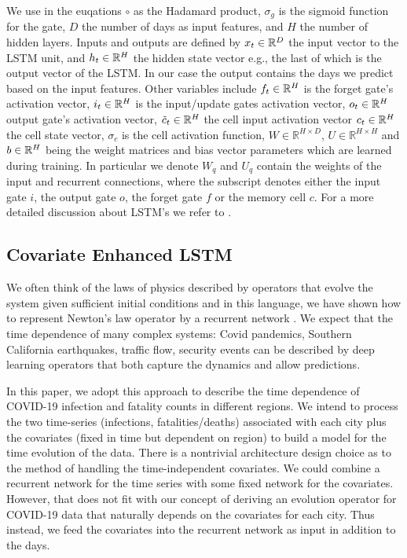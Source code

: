 \documentclass[a4paper, inpress]{jds} %
\renewcommand{\_}{%
    \textunderscore\hspace{0pt}%
}
\begin{document}
We use in the euqations $\circ$ as the Hadamard product,
$\sigma_g$ is the sigmoid function for the gate,
$D$ the number of days as input features, and
$H$ the number of hidden layers.
Inputs and outputs are defined by 
$x_{t} \in \mathbb{R}^{D}$ the input vector to the LSTM unit, and 
$h_{t}\in \mathbb{R}^{H}$ the hidden state vector e.g., the last of which is the output vector of the LSTM. In our case the output contains the days we predict based on the input features. Other variables include
$f_t \in \mathbb{R}^{H}$ is the forget gate's activation vector, 
$i_t \in \mathbb{R}^{H}$ is the input/update gates activation vector, 
$o_{t}\in \mathbb{R}^{H}$ output gate's activation vector, 
$\tilde{c}_{t}\in \mathbb{R}^{H}$ the cell input activation vector
$c_{t}\in \mathbb{R}^{H}$ the cell state vector,  
$\sigma_c$ is the cell activation function, 
$W\in \mathbb {R} ^{H\times D}$, $U\in \mathbb {R} ^{H\times H}$ and $b\in \mathbb{R}^{H}$ being the weight matrices and bias vector parameters which are learned during training.
In particular we denote $W_{q}$ and $U_{q}$ contain the weights of the
input and recurrent connections, where the subscript denotes either
the input gate $i$, the output gate $o$, the forget gate $f$ or the
memory cell $c$. For a more detailed discussion about LSTM's we refer to \cite{lstm-explained}. 



\subsection{Covariate Enhanced LSTM}

We often think of the laws of physics described by operators that
evolve the system given sufficient initial conditions and in this
language, we have shown how to represent Newton’s law operator by a
recurrent network \citep{Kadupitiya2020-zq}. We expect that the time
dependence of many complex systems: Covid pandemics, Southern
California earthquakes, traffic flow, security events can be described
by deep learning operators that both capture the dynamics and allow
predictions. 

In this paper, we adopt this approach to describe the
time dependence of COVID-19 infection and fatality counts in different
regions. 
We intend to
process the two time-series (infections, fatalities/deaths) associated with
each city plus the covariates (fixed in time but dependent on region)
to build a model for the time evolution of the data. There is a
nontrivial architecture design choice as to the method of handling the
time-independent covariates. We could combine a recurrent network for
the time series with some fixed network for the covariates. However,
that does not fit with our concept of deriving an evolution operator
for COVID-19 data that naturally depends on the covariates for each
city. Thus instead, we feed the covariates into the recurrent network as input in addition to the days.
\end{document}

